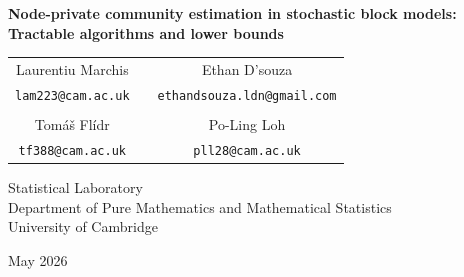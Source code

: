 \documentclass{article}
\begin{document}
\begin{center}
{\bf{\LARGE{Node-private community estimation in stochastic block models: Tractable algorithms and lower bounds}}} \\
\vspace*{.25in}
\begin{tabular}{ccc}
{\large{Laurentiu Marchis}} & \hspace*{.5in}  & {\large{Ethan D'souza}}\\
{\large{\texttt{lam223@cam.ac.uk}}} & \hspace*{.5in} & {\large{\texttt{ethandsouza.ldn@gmail.com}}} \\
\mbox{} & \vspace{0.1cm} & \mbox{} \\
{\large{Tom\'{a}\v{s} Fl\'{i}dr}} & \hspace*{.5in}  & {\large{Po-Ling Loh}}\\
{\large{\texttt{tf388@cam.ac.uk}}} & \hspace*{.5in} & {\large{\texttt{pll28@cam.ac.uk}}}
\end{tabular}
\begin{center}
Statistical Laboratory \\
Department of Pure Mathematics and Mathematical Statistics \\
University of Cambridge
\end{center}
\vspace*{.2in}
May 2026
\vspace*{.2in}
\end{center}
\end{document}
